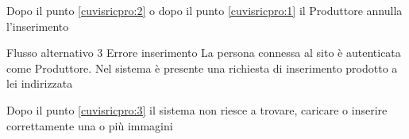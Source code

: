 {\postNulle}%
{\begin{enumCU}
		\item Dopo il punto \ref{cuvisricpro:2} o dopo il punto \ref{cuvisricpro:1} il Produttore annulla l'inserimento
	\end{enumCU}}%
%
{Flusso alternativo 3}%
{Errore inserimento}%
{La persona connessa al sito è autenticata come Produttore. Nel sistema è presente una richiesta di inserimento prodotto a lei indirizzata}
{\postNulle}%
{\begin{enumCU}
		\item Dopo il punto \ref{cuvisricpro:3} il sistema non riesce a trovare, caricare o inserire correttamente una o più immagini
	\end{enumCU}}%


